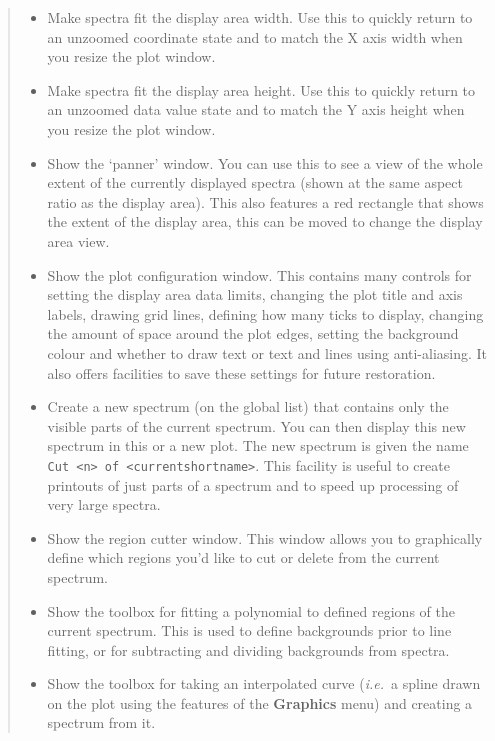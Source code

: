 \documentclass[twoside,11pt]{article}
\newcommand{\htmladdimg}[1]{}
\newcommand{\latexhtml}[2]{#1}
\renewcommand{\_}{\texttt{\symbol{95}}}
\newcommand{\inline}[1]
        {\latexhtml{\texttt{[image: sun243\_figures/\#1.eps]}}
        {\htmladdimg[align=center]{#1.gif}}}
\newcommand{\labelitem}[1]{\textbf{#1}}
\newcommand{\hitext}[1]{\texttt{#1}}
\newcommand{\ie}{\textit{i.e.}}
\begin{document}
\begin{quote}
\begin{itemize}
  \item[\inline{fitwidth}] Make spectra fit the display area width.  Use this
  to quickly return to an unzoomed coordinate state and to match the X axis
  width when you resize the plot window.

  \item[\inline{fitheight}] Make spectra fit the display area height.  Use
  this to quickly return to an unzoomed data value state and to match the Y
  axis height when you resize the plot window.

  \item[\inline{panner}] Show the `panner' window. You can use this to
  see a view of the whole extent of the currently displayed spectra
  (shown at the same aspect ratio as the display area). This also
  features a red rectangle that shows the extent of the display area,
  this can be moved to change the display area view.

  \item[\inline{config}] Show the plot configuration window. This
  contains many controls for setting the display area data limits,
  changing the plot title and axis labels, drawing grid lines,
  defining how many ticks to display, changing the amount of space
  around the plot edges, setting the background colour and whether to
  draw text or text and lines using anti-aliasing. It also offers
  facilities to save these settings for future restoration.

  \item[\inline{cutter}] Create a new spectrum (on the global list)
  that contains only the visible parts of the current spectrum. You
  can then display this new spectrum in this or a new plot. The new
  spectrum is given the name \hitext{Cut <n> of <current\_shortname>}.
  This facility is useful to create printouts of just parts of a
  spectrum and to speed up processing of very large spectra.

  \item[\inline{regioncutter}] Show the region cutter window. This
  window allows you to graphically define which regions you'd like to
  cut or delete from the current spectrum.

  \item[\inline{fitback}] Show the toolbox for fitting a polynomial to
  defined regions of the current spectrum. This is used to define
  backgrounds prior to line fitting, or for subtracting and dividing
  backgrounds from spectra.

  \item[\inline{interpolate}] Show the toolbox for taking an interpolated
  curve (\ie\ a spline drawn on the plot using the features of the
  \labelitem{Graphics} menu) and creating a spectrum from it.


\end{itemize}
\end{quote}
\end{document}

